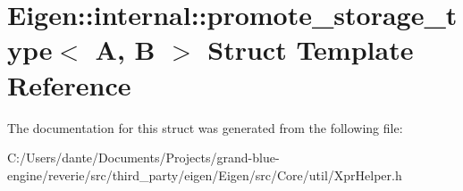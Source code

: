 \hypertarget{struct_eigen_1_1internal_1_1promote__storage__type}{}\section{Eigen\+::internal\+::promote\+\_\+storage\+\_\+type$<$ A, B $>$ Struct Template Reference}
\label{struct_eigen_1_1internal_1_1promote__storage__type}


The documentation for this struct was generated from the following file\+:\begin{DoxyCompactItemize}
\item 
C\+:/\+Users/dante/\+Documents/\+Projects/grand-\/blue-\/engine/reverie/src/third\+\_\+party/eigen/\+Eigen/src/\+Core/util/Xpr\+Helper.\+h\end{DoxyCompactItemize}
